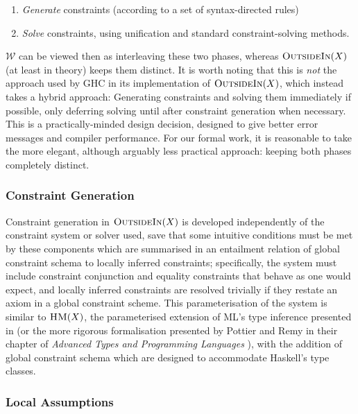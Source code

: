 \documentclass[a4paper]{jfp}
\newcommand{\outsidein}{\textsc{OutsideIn}(X)}
\begin{document}
\begin{enumerate}
\item \emph{Generate} constraints (according to a set of syntax-directed rules)
\item \emph{Solve} constraints, using unification and standard constraint-solving methods.	
\end{enumerate} 

$\mathcal{W}$ can be viewed then as interleaving these two phases, whereas $\outsidein$ (at least in theory) keeps them distinct. It is worth noting that this is \emph{not} the approach used by GHC in its implementation of $\outsidein$, which instead takes a hybrid approach: Generating constraints and solving them immediately if possible, only deferring solving until after constraint generation when necessary. This is a practically-minded design decision, designed to give better error messages and compiler performance. For our formal work, it is reasonable to take the more elegant, although arguably less practical approach: keeping both phases completely distinct.

\subsubsection{Constraint Generation}

Constraint generation in $\outsidein$ is developed independently of the constraint system or solver used, save that some intuitive conditions must be met by these components which are summarised in an entailment relation of global constraint schema to locally inferred constraints; specifically, the system must include constraint conjunction and equality constraints that behave as one would expect, and locally inferred constraints are resolved trivially if they restate an axiom in a global constraint scheme. This parameterisation of the system is similar to $\textsc{HM}(X)$, the parameterised extension of ML's type inference presented in \cite{Odersky97typeinference} (or the more rigorous formalisation presented by Pottier and Remy in their chapter of \emph{Advanced Types and Programming Languages} \cite{Pottier:2005ue}), with the addition of global constraint schema which are designed to accommodate Haskell's type classes.

\subsubsection{Local Assumptions}
\end{document}
